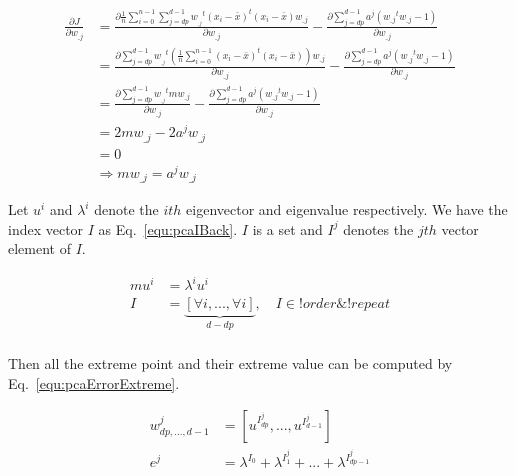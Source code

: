 \documentclass[runningheads,openany]{xhlPaper}
\begin{document}
\begin{equation}
\label{equ:pcaDerivationToW}
\begin{aligned}
\frac{{\partial J}}{{\partial {w_{\_j}}}} &= \frac{{\partial \frac{1}{n}\sum\limits_{i = 0}^{n - 1} {\sum\limits_{j = {dp}}^{d - 1} {{w_{_{\_j}}}^t{{\left( {{x_i} - \bar x} \right)}^t}\left( {{x_i} - \bar x} \right){w_{\_j}}} } }}{{\partial {w_{\_j}}}} - \frac{{\partial \sum\limits_{j = {dp}}^{d - 1} {{a^j}\left( {{w_{\_j}}^t{w_{\_j}} - 1} \right)} }}{{\partial {w_{\_j}}}}\\
 &= \frac{{\partial \sum\limits_{j = {dp}}^{d - 1} {{w_{_{\_j}}}^t\left( {\frac{1}{n}\sum\limits_{i = 0}^{n - 1} {{{\left( {{x_i} - \bar x} \right)}^t}\left( {{x_i} - \bar x} \right)} } \right){w_{\_j}}} }}{{\partial {w_{\_j}}}} - \frac{{\partial \sum\limits_{j = {dp}}^{d - 1} {{a^j}\left( {{w_{\_j}}^t{w_{\_j}} - 1} \right)} }}{{\partial {w_{\_j}}}}\\
 &= \frac{{\partial \sum\limits_{j = {dp}}^{d - 1} {{w_{_{\_j}}}^tm{w_{\_j}}} }}{{\partial {w_{\_j}}}} - \frac{{\partial \sum\limits_{j = {dp}}^{d - 1} {{a^j}\left( {{w_{\_j}}^t{w_{\_j}} - 1} \right)} }}{{\partial {w_{\_j}}}}\\
 &= 2m{w_{\_j}} - 2{a^j}{w_{\_j}}\\
 &= 0\\
 &\Rightarrow m{w_{\_j}} = {a^j}{w_{\_j}}
\end{aligned}
\end{equation}

Let $u^i$ and $\lambda ^i$ denote the $ith$ eigenvector and eigenvalue respectively. We have the index vector $I$ as Eq.~\ref{equ:pcaIBack}. $I$ is a set and $I^j$ denotes the $jth$ vector element of $I$.

\begin{equation}
\label{equ:pcaIBack}
\begin{aligned}
m{u^i} &= {\lambda ^i}{u^i}\\
I &= \underbrace {[\forall i,...,\forall i]}_{{d - dp}},\quad I \in !order\& !repeat\\
\end{aligned}
\end{equation}

Then all the extreme point and their extreme value can be computed by Eq.~\ref{equ:pcaErrorExtreme}.

\begin{equation}
\label{equ:pcaErrorExtreme}
\begin{aligned}
w^j_{dp,...,d - 1} &= [{u^{{I^j_{dp}}}},...,{u^{{I^j_{{d - 1}}}}}]\\
e^j &= {\lambda ^{{I_0}}} + {\lambda ^{{I^j_1}}} + ... + {\lambda ^{{I^j_{{dp} - 1}}}}
\end{aligned}
\end{equation}
\end{document}

